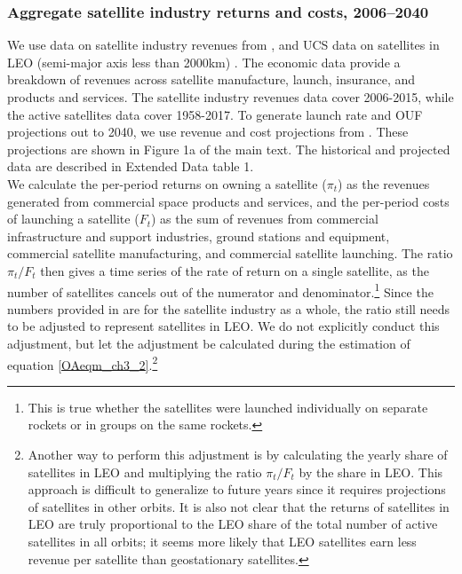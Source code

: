 \documentclass[9pt,twoside,lineno]{pnas-new}
\begin{document}
\subsubsection{Aggregate satellite industry returns and costs, 2006--2040}

We use data on satellite industry revenues from \citet{wienzierl2018}, and UCS data on satellites in LEO (semi-major axis less than 2000km) \citep{UCSdata}. The economic data provide a breakdown of revenues across satellite manufacture, launch, insurance, and products and services. The satellite industry revenues data cover 2006-2015, while the active satellites data cover 1958-2017. To generate launch rate and OUF projections out to 2040, we use revenue and cost projections from \citet{MSreport}. These projections are shown in Figure 1a of the main text. The historical and projected data are described in Extended Data table 1. \\

We calculate the per-period returns on owning a satellite ($\pi_t$) as the revenues generated from commercial space products and services, and the per-period costs of launching a satellite ($F_t$) as the sum of revenues from commercial infrastructure and support industries, ground stations and equipment, commercial satellite manufacturing, and commercial satellite launching. The ratio $\pi_t/F_t$ then gives a time series of the rate of return on a single satellite, as the number of satellites cancels out of the numerator and denominator.\footnote{This is true whether the satellites were launched individually on separate rockets or in groups on the same rockets.} Since the numbers provided in \citet{wienzierl2018} are for the satellite industry as a whole, the ratio still needs to be adjusted to represent satellites in LEO. We do not explicitly conduct this adjustment, but let the adjustment be calculated during the estimation of equation \ref{OAeqm_ch3_2}.\footnote{Another way to perform this adjustment is by calculating the yearly share of satellites in LEO and multiplying the ratio $\pi_t/F_t$ by the share in LEO. This approach is difficult to generalize to future years since it requires projections of satellites in other orbits. It is also not clear that the returns of satellites in LEO are truly proportional to the LEO share of the total number of active satellites in all orbits; it seems more likely that LEO satellites earn less revenue per satellite than geostationary satellites.} \\ %
\end{document}
